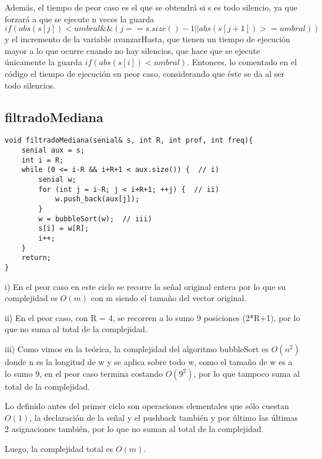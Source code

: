\documentclass{article}
\begin{document}
Además, el tiempo de peor caso es el que se obtendrá si s es todo silencio, ya que forzará a que se ejecute n
veces la guarda $if(abs(s[j]) < umbral \&\& (j == s.size()-1 || abs(s[j+1]) >= umbral))$ y el incremento de
la variable avanzarHasta, que tienen un tiempo de ejecución mayor a lo que ocurre cuando no hay silencios,
que hace que se ejecute únicamente la guarda $if(abs(s[i]) < umbral)$. Entonces, lo comentado en el código el tiempo de
ejecución en peor caso, considerando que éste se da al ser todo silencios.


\newpage
\subsection{filtradoMediana}
\begin{lstlisting}
void filtradoMediana(senial& s, int R, int prof, int freq){
    senial aux = s;
    int i = R;
    while (0 <= i-R && i+R+1 < aux.size()) {  // i)
        senial w;
        for (int j = i-R; j < i+R+1; ++j) {  // ii)
            w.push_back(aux[j]);
        }
        w = bubbleSort(w);  // iii)
        s[i] = w[R];
        i++;
    }
    return;
}
\end{lstlisting}

i) En el peor caso en este ciclo se recorre la señal original entera por lo que su complejidad es $O(m)$ con m siendo el tamaño del vector original.

ii) En el peor caso, con R = 4, se recorren a lo sumo 9 posiciones (2*R+1), por lo que no suma al total de la complejidad.

iii) Como vimos en la teórica, la complejidad del algoritmo bubbleSort es $O(n^2)$ donde n es la longitud de w y se aplica sobre todo w, como el tamaño de w es a lo sumo 9, en el peor caso termina costando $O(9^2)$, por lo que tampoco suma al total de la complejidad.

Lo definido antes del primer ciclo son operaciones elementales que sólo cuestan $O(1)$, la declaración de la señal y el pushback también y por último las últimas 2 asignaciones también, por lo que no suman al total de la complejidad.

Luego, la complejidad total es $O(m)$.
\end{document}
